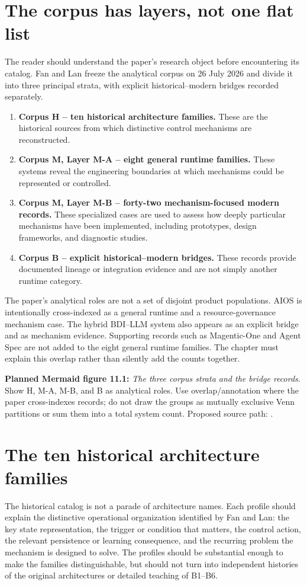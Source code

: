 \section{The corpus has layers, not one flat list}
The reader should understand the paper's research object before encountering its catalog. Fan and Lan freeze the analytical corpus on 26 July 2026 and divide it into three principal strata, with explicit historical--modern bridges recorded separately.
\begin{enumerate}
  \item \textbf{Corpus H -- ten historical architecture families.} These are the historical sources from which distinctive control mechanisms are reconstructed.
  \item \textbf{Corpus M, Layer M-A -- eight general runtime families.} These systems reveal the engineering boundaries at which mechanisms could be represented or controlled.
  \item \textbf{Corpus M, Layer M-B -- forty-two mechanism-focused modern records.} These specialized cases are used to assess how deeply particular mechanisms have been implemented, including prototypes, design frameworks, and diagnostic studies.
  \item \textbf{Corpus B -- explicit historical--modern bridges.} These records provide documented lineage or integration evidence and are not simply another runtime category.
\end{enumerate}
\begin{notebox}
The paper's analytical roles are not a set of disjoint product populations. AIOS is intentionally cross-indexed as a general runtime and a resource-governance mechanism case. The hybrid BDI--LLM system also appears as an explicit bridge and as mechanism evidence. Supporting records such as Magentic-One and Agent Spec are not added to the eight general runtime families. The chapter must explain this overlap rather than silently add the counts together.
\end{notebox}
\textbf{Planned Mermaid figure 11.1:} \emph{The three corpus strata and the bridge records}. Show H, M-A, M-B, and B as analytical roles. Use overlap/annotation where the paper cross-indexes records; do not draw the groups as mutually exclusive Venn partitions or sum them into a total system count. Proposed source path: .

\section{The ten historical architecture families}
The historical catalog is not a parade of architecture names. Each profile should explain the distinctive operational organization identified by Fan and Lan: the key state representation, the trigger or condition that matters, the control action, the relevant persistence or learning consequence, and the recurring problem the mechanism is designed to solve. The profiles should be substantial enough to make the families distinguishable, but should not turn into independent histories of the original architectures or detailed teaching of B1--B6.

